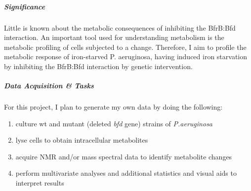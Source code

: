 \documentclass[
]{article}
\begin{document}
\hypertarget{significance}{%
\subparagraph{Significance}\label{significance}}

Little is known about the metabolic consequences of inhibiting the
BfrB:Bfd interaction. An important tool used for understanding
metabolism is the metabolic profiling of cells subjected to a change.
Therefore, I aim to profile the metabolic response of iron-starved P.
aeruginosa, having induced iron starvation by inhibiting the BfrB:Bfd
interaction by genetic intervention.

\hypertarget{data-acquisition-tasks}{%
\subparagraph{Data Acquisition \& Tasks}\label{data-acquisition-tasks}}

For this project, I plan to generate my own data by doing the following:

\begin{enumerate}
\def\labelenumi{\arabic{enumi}.}
\item
  culture wt and mutant (deleted \emph{bfd} gene) strains of
  \emph{P.aeruginosa}
\item
  lyse cells to obtain intracellular metabolites
\item
  acquire NMR and/or mass spectral data to identify metabolite changes
\item
  perform multivariate analyses and additional statistics and visual
  aids to interpret results
\end{enumerate}
\end{document}
